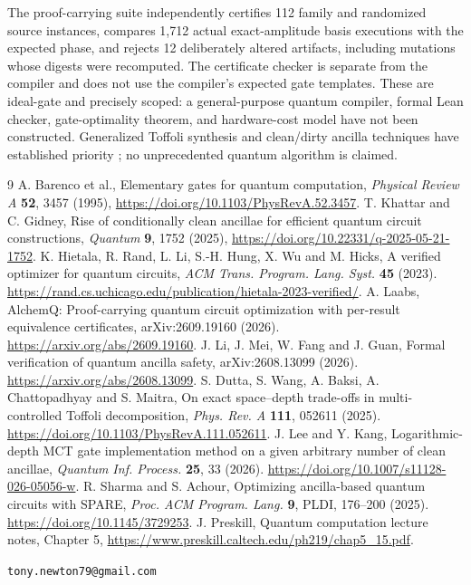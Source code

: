 \documentclass[11pt,a4paper]{article}
\begin{document}
The proof-carrying suite independently certifies
112 family and randomized source instances,
compares 1,712 actual exact-amplitude basis
executions with the expected phase, and
rejects 12 deliberately altered artifacts,
including mutations whose digests were
recomputed. The certificate checker is
separate from the compiler and does not
use the compiler's expected gate templates.
These are ideal-gate and precisely scoped:
a general-purpose quantum compiler,
formal Lean checker, gate-optimality
theorem, and hardware-cost model have
not been constructed. Generalized Toffoli synthesis and clean/dirty ancilla techniques have established priority \cite{barenco,khattar}; no unprecedented quantum algorithm is claimed.
\begin{thebibliography}{9}
 A. Barenco et al., Elementary gates for quantum computation, \emph{Physical Review A} \textbf{52}, 3457 (1995), \url{https://doi.org/10.1103/PhysRevA.52.3457}.
 T. Khattar and C. Gidney, Rise of conditionally clean ancillae for efficient quantum circuit constructions, \emph{Quantum} \textbf{9}, 1752 (2025), \url{https://doi.org/10.22331/q-2025-05-21-1752}.
K. Hietala, R. Rand, L. Li, S.-H. Hung, X. Wu
and M. Hicks, A verified optimizer for
quantum circuits, \emph{ACM Trans. Program.
Lang. Syst.} \textbf{45} (2023).
\url{https://rand.cs.uchicago.edu/publication/hietala-2023-verified/}.
A. Laabs, AlchemQ: Proof-carrying quantum
circuit optimization with per-result equivalence
certificates, arXiv:2609.19160 (2026).
\url{https://arxiv.org/abs/2609.19160}.
J. Li, J. Mei, W. Fang and J. Guan,
Formal verification of quantum ancilla
safety, arXiv:2608.13099 (2026).
\url{https://arxiv.org/abs/2608.13099}.
S. Dutta, S. Wang, A. Baksi, A. Chattopadhyay
and S. Maitra, On exact space--depth trade-offs
in multi-controlled Toffoli decomposition,
\emph{Phys. Rev. A} \textbf{111}, 052611 (2025).
\url{https://doi.org/10.1103/PhysRevA.111.052611}.
J. Lee and Y. Kang, Logarithmic-depth MCT gate
implementation method on a given arbitrary
number of clean ancillae, \emph{Quantum Inf.
Process.} \textbf{25}, 33 (2026).
\url{https://doi.org/10.1007/s11128-026-05056-w}.
R. Sharma and S. Achour, Optimizing ancilla-based
quantum circuits with SPARE,
\emph{Proc. ACM Program. Lang.} \textbf{9},
PLDI, 176--200 (2025).
\url{https://doi.org/10.1145/3729253}.
 J. Preskill, Quantum computation lecture notes, Chapter 5, \url{https://www.preskill.caltech.edu/ph219/chap5_15.pdf}.
\end{thebibliography}
\medskip\noindent\texttt{tony.newton79@gmail.com}
\end{document}
